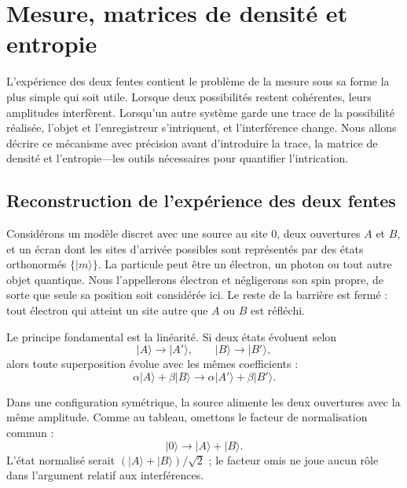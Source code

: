 \chapter{Mesure, matrices de densité et entropie}

L’expérience des deux fentes contient le problème de la mesure sous sa forme la plus simple qui soit utile. Lorsque deux possibilités restent cohérentes, leurs amplitudes interfèrent. Lorsqu’un autre système garde une trace de la possibilité réalisée, l’objet et l’enregistreur s’intriquent, et l’interférence change. Nous allons décrire ce mécanisme avec précision avant d’introduire la trace, la matrice de densité et l’entropie---les outils nécessaires pour quantifier l’intrication.

\section{Reconstruction de l’expérience des deux fentes}

Considérons un modèle discret avec une source au site \(0\), deux ouvertures \(A\) et \(B\), et un écran dont les sites d’arrivée possibles sont représentés par des états orthonormés \(\{|m\rangle\}\). La particule peut être un électron, un photon ou tout autre objet quantique. Nous l’appellerons électron et négligerons son spin propre, de sorte que seule sa position soit considérée ici. Le reste de la barrière est fermé : tout électron qui atteint un site autre que \(A\) ou \(B\) est réfléchi.

Le principe fondamental est la linéarité. Si deux états évoluent selon
\begin{equation}
|A\rangle\longrightarrow |A'\rangle,
\qquad
|B\rangle\longrightarrow |B'\rangle,
\end{equation}
alors toute superposition évolue avec les mêmes coefficients :
\begin{equation}
\alpha|A\rangle+\beta|B\rangle
\longrightarrow
\alpha|A'\rangle+\beta|B'\rangle.
\end{equation}

Dans une configuration symétrique, la source alimente les deux ouvertures avec la même amplitude. Comme au tableau, omettons le facteur de normalisation commun :
\begin{equation}
|0\rangle\longrightarrow |A\rangle+|B\rangle.
\end{equation}
L’état normalisé serait \((|A\rangle+|B\rangle)/\sqrt{2}\) ; le facteur omis ne joue aucun rôle dans l’argument relatif aux interférences.

